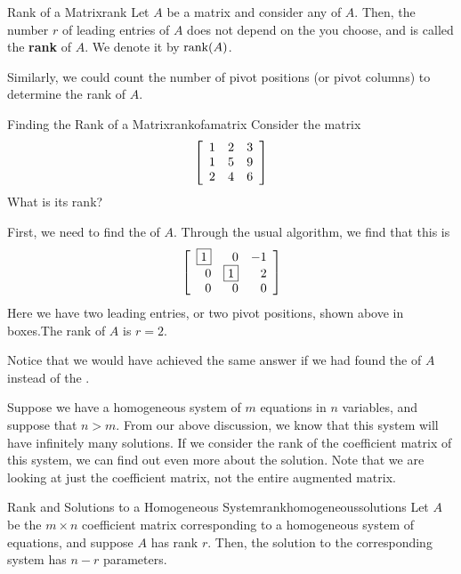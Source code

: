 \begin{definition}{Rank of a Matrix}{rank}
Let $A$ be a matrix and consider any \ef \;of $A$.
Then, the number $r$ of leading entries of $A$ does not depend on the \ef \;you choose, and is called the \textbf{rank}  of $A$. We denote it by $\mbox{rank}(A)$.
\end{definition}

Similarly, we could count the number of pivot positions (or pivot columns)
to determine the rank of $A$. 

\begin{example}{Finding the Rank of a Matrix}{rankofamatrix}
\label{example:rankofamatrix}
Consider the matrix
\begin{equation*}
\left[
\begin{array}{rrr}
1 & 2 & 3 \\
1 & 5 & 9 \\
2 & 4 & 6 
\end{array}
\right]
\end{equation*}
What is its rank?
\end{example}

\begin{solution}
First, we need to find the \rref \;of $A$. Through the usual algorithm, we find that this is
\begin{equation*}
\left[
\begin{array}{rrr}
\fbox{1} & 0 & -1 \\
0 & \fbox{1} & 2 \\
0 & 0 & 0
\end{array}
\right]
\end{equation*}
Here we have two leading entries, or two pivot positions, shown above in boxes.The rank of $A$ is $r = 2.$
\end{solution}

Notice that we would have achieved the same answer if we had found the \ef \;of $A$ instead of the \rref. 

Suppose we have a homogeneous system of $m$ equations in $n$ variables, and suppose that
$n > m$. From our above discussion, we know that this system will have infinitely many solutions. If we consider the rank of the coefficient
 matrix of this system, we can find out even more about the solution. Note that we are looking at just the coefficient matrix, not the entire
augmented matrix. 

\begin{theorem}{Rank and Solutions to a Homogeneous System}{rankhomogeneoussolutions}
Let $A$ be the $m \times n$ coefficient matrix corresponding to a homogeneous system of equations, and suppose $A$ has rank $r$. 
Then, the solution to the corresponding system has $n-r$ parameters. 
\end{theorem}

